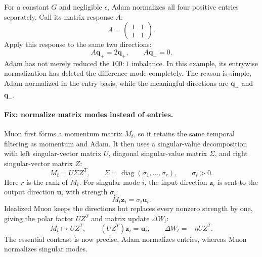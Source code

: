 \documentclass[11pt,letterpaper]{article}
\newcommand{\diag}{\operatorname{diag}}
\begin{document}
For a constant \(G\) and negligible \(\epsilon\), Adam normalizes all four
positive entries separately. Call its matrix response \(A\):
\begin{equation}
  A=\begin{pmatrix}1&1\\1&1\end{pmatrix}.
\end{equation}
Apply this response to the same two directions:
\begin{equation}
  A\bm q_+=2\bm q_+,
  \qquad
  A\bm q_-=0.
\end{equation}
Adam has not merely reduced the \(100{:}1\) imbalance. In this example, its
entrywise normalization has deleted the difference mode completely. The
reason is simple, Adam normalized in the entry basis, while the meaningful
directions are \(\bm q_+\) and \(\bm q_-\).

\paragraph{Fix: normalize matrix modes instead of entries.}
Muon first forms a momentum matrix \(M_t\), so it retains the same temporal
filtering as momentum and Adam. It then uses a singular-value decomposition
with left singular-vector matrix \(U\), diagonal singular-value matrix
\(\Sigma\), and right singular-vector matrix \(Z\):
\begin{equation}\label{eq:svd}
  M_t=U\Sigma Z^T,
  \qquad
  \Sigma=\diag(\sigma_1,\ldots,\sigma_r),
  \qquad
  \sigma_i>0.
\end{equation}
Here \(r\) is the rank of \(M_t\). For singular mode \(i\), the input
direction \(\bm z_i\) is sent to the output direction \(\bm u_i\) with
strength \(\sigma_i\):
\begin{equation}
  M_t\bm z_i=\sigma_i\bm u_i.
\end{equation}
Idealized Muon keeps the directions but replaces every nonzero strength by
one, giving the polar factor \(UZ^T\) and matrix update \(\Delta W_t\):
\begin{equation}\label{eq:muon_polar}
  M_t\longmapsto UZ^T,
  \qquad
  (UZ^T)\bm z_i=\bm u_i,
  \qquad
  \Delta W_t=-\eta UZ^T.
\end{equation}
The essential contrast is
now precise, Adam normalizes entries, whereas Muon normalizes singular modes.
\end{document}
